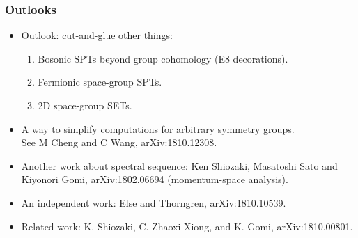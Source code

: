 \documentclass[xcolor=table, 10pt, aspectratio=43]{beamer}
\begin{document}
\begin{frame}
\frametitle{Outlooks}
\begin{itemize}
\item Outlook: cut-and-glue other things:
\begin{enumerate}
\item Bosonic SPTs beyond group cohomology (E8 decorations).
\item Fermionic space-group SPTs.
\item 2D space-group SETs.
\end{enumerate}
\item A way to simplify computations for arbitrary symmetry groups.\\
See M Cheng and C Wang, arXiv:1810.12308.
\item Another work about spectral sequence: Ken Shiozaki, Masatoshi Sato and Kiyonori Gomi, arXiv:1802.06694 (momentum-space analysis).
\item An independent work: Else and Thorngren, arXiv:1810.10539.
\item Related work: K. Shiozaki, C. Zhaoxi Xiong, and K. Gomi,
arXiv:1810.00801.
\end{itemize}
\end{frame}
\end{document}
